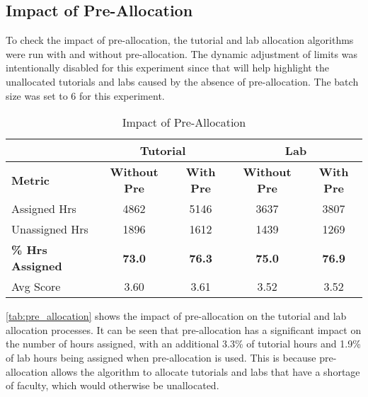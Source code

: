 \subsection{Impact of Pre-Allocation}

To check the impact of pre-allocation, the tutorial and lab allocation algorithms were run with and without pre-allocation. The dynamic adjustment of limits was intentionally disabled for this experiment since that will help highlight the unallocated tutorials and labs caused by the absence of pre-allocation. The batch size was set to 6 for this experiment.

\begin{table}[H]
  \centering
  \begin{tabular}{|l|c|c|c|c|}
    \hline
                             & \multicolumn{2}{c|}{Tutorial} & \multicolumn{2}{c|}{Lab}                                            \\ \hline
    \textbf{Metric}          & \textbf{Without Pre}          & \textbf{With Pre}        & \textbf{Without Pre} & \textbf{With Pre} \\ \hline
    Assigned Hrs             & 4862                          & 5146                     & 3637                 & 3807              \\ \hline
    Unassigned Hrs           & 1896                          & 1612                     & 1439                 & 1269              \\ \hline
    \textbf{\% Hrs Assigned} & \textbf{73.0}                 & \textbf{76.3}            & \textbf{75.0}        & \textbf{76.9}     \\ \hline
    Avg Score                & 3.60                          & 3.61                     & 3.52                 & 3.52              \\ \hline
  \end{tabular}
  \caption{Impact of Pre-Allocation}
  \label{tab:pre_allocation}
\end{table}

\autoref{tab:pre_allocation} shows the impact of pre-allocation on the tutorial and lab allocation processes. It can be seen that pre-allocation has a significant impact on the number of hours assigned, with an additional 3.3\% of tutorial hours and 1.9\% of lab hours being assigned when pre-allocation is used. This is because pre-allocation allows the algorithm to allocate tutorials and labs that have a shortage of faculty, which would otherwise be unallocated.

